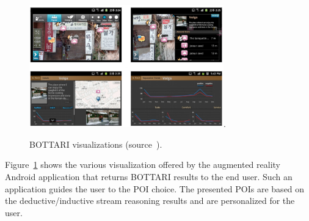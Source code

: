 \begin{figure}[t]
	\centering
	\includegraphics[width=0.75\textwidth]{img/bottari2.pdf}.
    \caption{BOTTARI visualizations (source~\cite{DBLP:conf/semweb/BalduiniVDTPC13}).}
    \label{fig:bottari-vis}
\end{figure}

Figure~\ref{fig:bottari-vis} shows the various visualization offered by the augmented reality Android application that returns BOTTARI results to the end user. Such an application guides the user to the POI choice. The presented POIs are based on the deductive/inductive stream reasoning results and are personalized for the user.